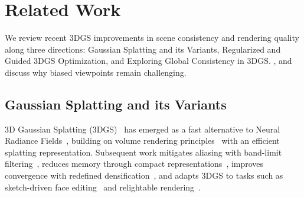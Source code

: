 \documentclass[lettersize,journal]{IEEEtran}
\begin{document}
\section{Related Work}

We review recent 3DGS improvements in scene consistency and rendering quality along three directions: Gaussian Splatting and its Variants, Regularized and Guided 3DGS Optimization, and Exploring Global Consistency in 3DGS.
, and discuss why biased viewpoints remain challenging.


\subsection{Gaussian Splatting and its Variants}

3D Gaussian Splatting (3DGS)~\cite{3dgs} has emerged as a fast alternative to Neural Radiance Fields~\cite{nerf}, building on volume rendering principles~\cite{ewa} with an efficient splatting representation. 
Subsequent work mitigates aliasing with band-limit filtering~\cite{mipsplatting}, reduces memory through compact representations~\cite{scaffold,hi-lsplat}, improves convergence with redefined densification~\cite{ekf-gs,densesplat,steepgs,mcmc}, and adapts 3DGS to tasks such as sketch-driven face editing~\cite{sketchfacegs} and relightable rendering~\cite{ssdgs}.
\end{document}
